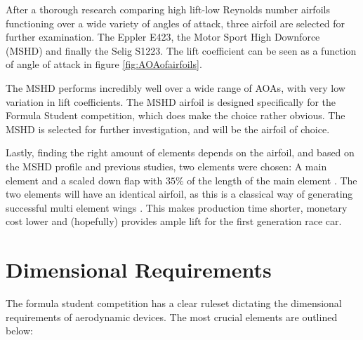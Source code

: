     After a thorough research comparing high lift-low Reynolds number airfoils functioning over a wide variety of angles of attack, three airfoil are selected for further examination. The Eppler E423, the Motor Sport High Downforce (MSHD) and finally the Selig S1223. The lift coefficient can be seen as a function of angle of attack in figure \ref{fig:AOAofairfoils}.

    The MSHD performs incredibly well over a wide range of AOAs, with very low variation in lift coefficients. The MSHD airfoil is designed specifically for the Formula Student competition, which does make the choice rather obvious. The MSHD is selected for further investigation, and will be the airfoil of choice.

    Lastly, finding the right amount of elements depends on the airfoil, and based on the MSHD profile and previous studies, two elements were chosen: A main element and a scaled down flap with $35\%$ of the length of the main element \cite{winginitialangle}. The two elements will have an identical airfoil, as this is a classical way of generating successful multi element wings \cite{sameairfoilgoodidea}. This makes production time shorter, monetary cost lower and (hopefully) provides ample lift for the first generation race car.

  \section{Dimensional Requirements}

    The formula student competition has a clear ruleset dictating the dimensional requirements of aerodynamic devices. The most crucial elements are outlined below:

